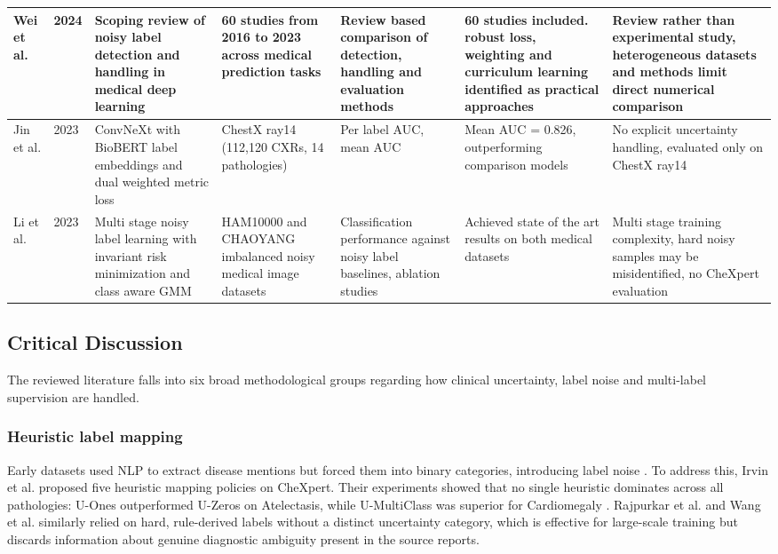 \documentclass[conference]{IEEEtran}
\begin{document}
\begin{table}[!t]
\begin{tabular}{P{0.09}P{0.04}P{0.18}P{0.15}P{0.11}P{0.18}P{0.15}}
\midrule
Wei et al. \cite{ref15} & 2024 & Scoping review of noisy label detection and handling in medical deep learning & 60 studies from 2016 to 2023 across medical prediction tasks & Review based comparison of detection, handling and evaluation methods & 60 studies included. robust loss, weighting and curriculum learning identified as practical approaches & Review rather than experimental study, heterogeneous datasets and methods limit direct numerical comparison \\
\midrule
Jin et al. \cite{ref16} & 2023 & ConvNeXt with BioBERT label embeddings and dual weighted metric loss & ChestX ray14 (112,120 CXRs, 14 pathologies) & Per label AUC, mean AUC & Mean AUC = 0.826, outperforming comparison models & No explicit uncertainty handling, evaluated only on ChestX ray14 \\
\midrule
Li et al. \cite{ref17} & 2023 & Multi stage noisy label learning with invariant risk minimization and class aware GMM & HAM10000 and CHAOYANG imbalanced noisy medical image datasets & Classification performance against noisy label baselines, ablation studies & Achieved state of the art results on both medical datasets & Multi stage training complexity, hard noisy samples may be misidentified, no CheXpert evaluation \\
\bottomrule
\end{tabular}
\end{table}

\subsection{Critical Discussion}
The reviewed literature falls into six broad methodological groups regarding how clinical uncertainty, label noise and multi-label supervision are handled.

\subsubsection*{Heuristic label mapping}
Early datasets used NLP to extract disease mentions but forced them into binary categories, introducing label noise \cite{ref3}. To address this, Irvin et al. \cite{ref1} proposed five heuristic mapping policies on CheXpert. Their experiments showed that no single heuristic dominates across all pathologies: U-Ones outperformed U-Zeros on Atelectasis, while U-MultiClass was superior for Cardiomegaly \cite{ref1}. Rajpurkar et al. \cite{ref2} and Wang et al. \cite{ref3} similarly relied on hard, rule-derived labels without a distinct uncertainty category, which is effective for large-scale training but discards information about genuine diagnostic ambiguity present in the source reports.
\end{document}
